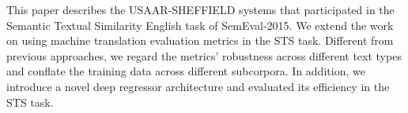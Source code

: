 This paper describes the USAAR-SHEFFIELD systems that participated in the Semantic Textual Similarity English task of SemEval-2015. We extend the work on using machine translation evaluation metrics in the STS task. Different from previous approaches, we regard the metrics' robustness across different text types and conflate the training data across different subcorpora. In addition, we introduce a novel deep regressor architecture and evaluated its efficiency in the STS task.
